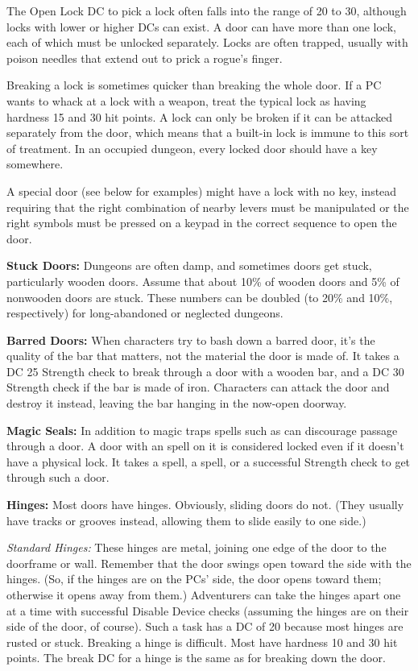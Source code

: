 The Open Lock DC to pick a lock often falls into the range of 20 to 30, although locks with lower or higher DCs can exist. A door can have more than one lock, each of which must be unlocked separately. Locks are often trapped, usually with poison needles that extend out to prick a rogue's finger.

Breaking a lock is sometimes quicker than breaking the whole door. If a PC wants to whack at a lock with a weapon, treat the typical lock as having hardness 15 and 30 hit points. A lock can only be broken if it can be attacked separately from the door, which means that a built-in lock is immune to this sort of treatment. In an occupied dungeon, every locked door should have a key somewhere. 

A special door (see below for examples) might have a lock with no key, instead requiring that the right combination of nearby levers must be manipulated or the right symbols must be pressed on a keypad in the correct sequence to open the door.

\textbf{Stuck Doors:} Dungeons are often damp, and sometimes doors get stuck, particularly wooden doors. Assume that about 10\% of wooden doors and 5\% of nonwooden doors are stuck. These numbers can be doubled (to 20\% and 10\%, respectively) for long-abandoned or neglected dungeons.

\textbf{Barred Doors:} When characters try to bash down a barred door, it's the quality of the bar that matters, not the material the door is made of. It takes a DC 25 Strength check to break through a door with a wooden bar, and a DC 30 Strength check if the bar is made of iron. Characters can attack the door and destroy it instead, leaving the bar hanging in the now-open doorway.

\textbf{Magic Seals:} In addition to magic traps spells such as can discourage passage through a door. A door with an spell on it is considered locked even if it doesn't have a physical lock. It takes a  spell, a  spell, or a successful Strength check to get through such a door.

\textbf{Hinges:} Most doors have hinges. Obviously, sliding doors do not. (They usually have tracks or grooves instead, allowing them to slide easily to one side.)

\textit{Standard Hinges:} These hinges are metal, joining one edge of the door to the doorframe or wall. Remember that the door swings open toward the side with the hinges. (So, if the hinges are on the PCs' side, the door opens toward them; otherwise it opens away from them.) Adventurers can take the hinges apart one at a time with successful Disable Device checks (assuming the hinges are on their side of the door, of course). Such a task has a DC of 20 because most hinges are rusted or stuck. Breaking a hinge is difficult. Most have hardness 10 and 30 hit points. The break DC for a hinge is the same as for breaking down the door.

